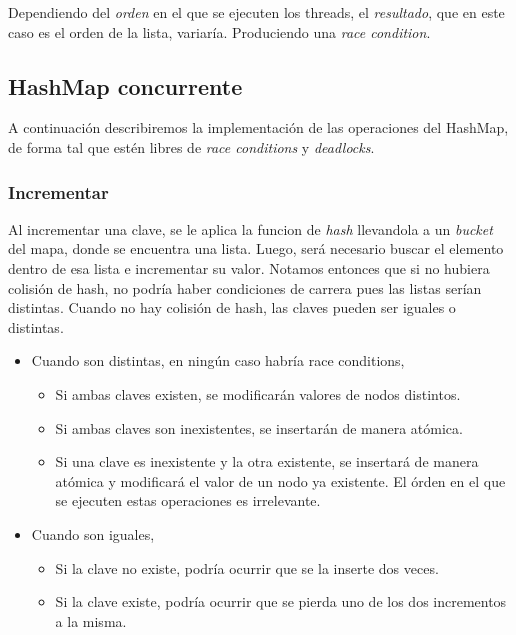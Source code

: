 \documentclass[a4paper]{article}
\begin{document}
Dependiendo del \textit{orden} en el que se ejecuten los threads, el \textit{resultado}, que en este caso es el orden de la lista, variaría. Produciendo una \textit{race condition}.

\subsection{HashMap concurrente}

A continuación describiremos la implementación de las operaciones del HashMap, de forma tal que estén libres de \textit{race conditions} y \textit{deadlocks}.

\subsubsection{Incrementar}

Al incrementar una clave, se le aplica la funcion de \textit{hash} llevandola a un \textit{bucket} del mapa, donde se encuentra una lista. Luego, será necesario buscar el elemento dentro de esa lista e incrementar su valor. Notamos entonces que si no hubiera colisión de hash, no podría haber condiciones de carrera pues las listas serían distintas. Cuando no hay colisión de hash, las claves pueden ser iguales o distintas.

\begin{itemize}
    \item Cuando son distintas, en ningún caso habría race conditions,
    \begin{itemize}
        \item Si ambas claves existen, se modificarán valores de nodos distintos.
        \item Si ambas claves son inexistentes, se insertarán de manera atómica.
        \item Si una clave es inexistente y la otra existente, se insertará de manera atómica y modificará el valor de un nodo ya existente. El órden en el que se ejecuten estas operaciones es irrelevante.
    \end{itemize}
    \item Cuando son iguales,
    \begin{itemize}
        \item Si la clave no existe, podría ocurrir que se la inserte dos veces.
        \item Si la clave existe, podría ocurrir que se pierda uno de los dos incrementos a la misma.
    \end{itemize}
\end{itemize}
\end{document}
